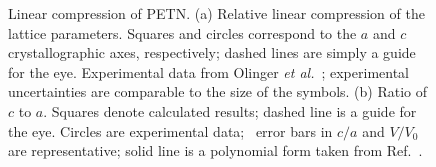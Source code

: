 \documentclass[prb,aps,nobibnotes,twocolumn,doublespace,twocolumngrid,superbib]{revtex4}
\begin{document}
\begin{figure}
\caption{Linear compression of PETN.  (a) Relative linear compression
of the lattice parameters. Squares and circles correspond to the $a$
and $c$ crystallographic axes, respectively; dashed lines are simply a
guide for the eye.  Experimental data from Olinger {\it et
al.}~\cite{Olinger_1975v62}; experimental uncertainties are comparable
to the size of the symbols. (b) Ratio of $c$ to $a$.  Squares denote
calculated results; dashed line is a guide for the eye.  Circles are
experimental data;~\cite{Olinger_1975v62} error bars in $c/a$ and
$V/V_0$ are representative; solid line is a polynomial form taken from
Ref.~\cite{Olinger_1975v62}.  }
\label{fig:linear_compress}
\end{figure}
\end{document}
